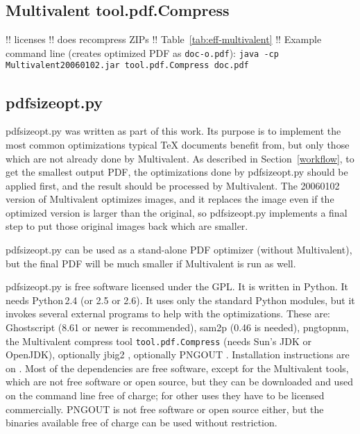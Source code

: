 \documentclass{ltugproc}
\def\cmd{\textsf}
\begin{document}
\subsection{Multivalent tool.pdf.Compress}

!! licenses
!! does recompress ZIPs
!! Table~\ref{tab:eff-multivalent}
!! Example command line (creates optimized PDF as \texttt{doc-o.pdf}):
\texttt{java -cp Multivalent20060102.jar tool.pdf.Compress doc.pdf}

\subsection{pdfsizeopt.py}

\cmd{pdfsizeopt.py} \cite{pdfsizeopt} was written as part of this work. Its purpose is to
implement the most common optimizations typical \TeX{} documents benefit
from, but only those which are not already done by Multivalent. As described
in Section~\ref{workflow}, to get the smallest output PDF, the optimizations
done by \cmd{pdfsizeopt.py} should be applied first, and the result should
be processed by Multivalent. The 20060102 version of Multivalent
optimizes images, and it replaces the image even if the optimized version is
larger than the original, so \cmd{pdfsizeopt.py} implements a final step
to put those original images back which are smaller. 

\cmd{pdfsizeopt.py} can be used as a stand-alone PDF optimizer (without
Multivalent), but the final PDF will be much smaller if Multivalent
is run as well.

\cmd{pdfsizeopt.py} is free software licensed under the GPL. It is written
in Python. It needs Python\,2.4 (or 2.5 or 2.6). It uses only the standard
Python modules, but it invokes several external programs to help with the
optimizations. These are: Ghostscript (8.61 or newer is recommended),
\cmd{sam2p} \cite{sam2p} (0.46 is needed), pngtopnm,
the Multivalent compress tool \texttt{tool.pdf.Compress}
\cite{multivalent-compress-tool} (needs Sun's JDK or OpenJDK), 
optionally \cmd{jbig2} \cite{jbig2enc}, optionally PNGOUT \cite{pngout}.
Installation instructions are on \cite{pdfsizeopt-install}. Most of the
dependencies are free software, except for the Multivalent tools, which
are not free software or open source, but they can be downloaded and used on
the command line free of charge; for other uses they have to be licensed
commercially. PNGOUT is not free software or open source either, but the
binaries available free of charge can be used without restriction.
\end{document}
